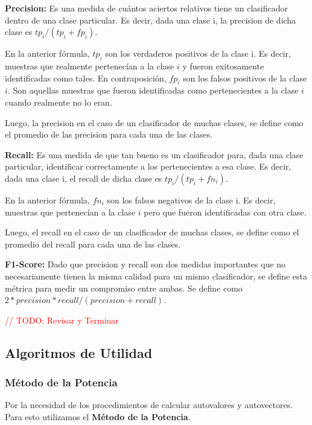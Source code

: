 \textbf{Precision:} Es una medida de cu\'antos aciertos relativos tiene un clasificador dentro de una clase particular. Es decir, dada una clase i, la precision de dicha clase es $tp_{i} / (tp_{i} + fp_{i})$.

En la anterior f\'ormula, $tp_{i}$ son los verdaderos positivos de la clase i. Es decir, muestras que realmente pertenec\'ian a la clase $i$ y fueron exitosamente identificadas como tales. En contraposici\'on, $fp_{i}$ son los falsos positivos de la clase $i$. Son aquellas muestras que fueron identificadas como pertenecientes a la clase $i$ cuando realmente no lo eran.

Luego, la precision en el caso de un clasificador de muchas clases, se define como el promedio de las precision para cada una de las clases.

\textbf{Recall:} Es una medida de que tan bueno es un clasificador para, dada una clase particular, identificar correctamente a los pertenecientes a esa clase. Es decir, dada una clase i, el recall de dicha clase es $tp_{i} / (tp_{i} + fn_{i})$.

En la anterior f\'ormula, $fn_{i}$ son los falsos negativos de la clase i. Es decir, muestras que pertenec\'ian a la clase $i$ pero que fueron identificadas con otra clase.

Luego, el recall en el caso de un clasificador de muchas clases, se define como el promedio del recall para cada una de las clases.

\textbf{F1-Score:} Dado que precision y recall son dos medidas importantes que no necesariamente tienen la misma calidad para un mismo clasificador, se define esta m\'etrica para medir un compromiso entre ambas. Se define como $2 * precision * recall / (precision + recall)$.

\textcolor{red}{// TODO: Revisar y Terminar}

\subsection{Algoritmos de Utilidad}

\subsubsection{M\'etodo de la Potencia}\label{desarrollo_metodo-potencia}

Por la necesidad de los procedimientos de calcular autovalores y autovectores. Para esto utilizamos el \textbf{M\'etodo de la Potencia}.

